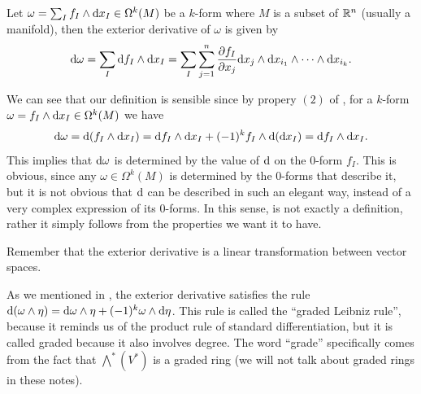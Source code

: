 \documentclass[11pt,a4paper]{article}
\begin{document}
\begin{definition}
  \label{def:exterior-derivative}
  Let $\omega = \sum_{I} f_{I} \wedge \dx_{I} \in \Omega^k(M)$
  be a $k$-form where $M$ is a subset of $\mathbb{R}^n$ (usually a manifold),
  then the exterior derivative of $\omega$
  is given by
  \[
    \dif \omega =
    \sum_{I} \dif f_I \wedge \dx_{I} =
    \sum_{I} \sum_{j=1}^{n}
      \frac{\partial f_I}{\partial x_j} \dx_j \wedge
        \dx_{i_1} \wedge \cdots \wedge \dx_{i_k}.
  \]
\end{definition}
\begin{remark}
  We can see that our definition is sensible since by propery $(2)$
  of ,
  for a $k$-form $\omega = f_I \wedge \dx_{I} \in \Omega^k(M)$ we have
  \[
    \dif \omega =
    \dif(f_I \wedge \dx_{I}) =
    \dif f_I \wedge \dx_I + (-1)^k f_I \wedge \dif (\dif x_I) =
    \dif f_I \wedge \dx_I.
  \]
  This implies that $\mathrm{d} \omega$ is determined by the value of $\mathrm{d}$
  on the $0$-form $f_I$.
  This is obvious, since any $\omega \in \Omega^k(M)$
  is determined by the $0$-forms that describe it,
  but it is not obvious that $\mathrm{d}$ can be described in such an
  elegant way, instead of a very complex expression of its $0$-forms.
  In this sense, 
  is not exactly a definition, rather it simply follows from the properties
  we want it to have.
\end{remark}

\begin{remark}
  Remember that the exterior derivative is a linear transformation between
  vector spaces.
\end{remark}
\begin{remark}
  As we mentioned in ,
  the exterior derivative satisfies the rule
  $\mathrm{d} (\omega \wedge \eta) =
        \mathrm{d} \omega \wedge \eta + (-1)^{k} \omega \wedge \mathrm{d} \eta$.
  This rule is called the ``graded Leibniz rule'',
  because it reminds us of the product rule of standard differentiation,
  but it is called graded because it also involves degree.
  The word ``grade'' specifically comes from
  the fact that $\bigwedge^{\!*}(V^*)$ is a graded ring
  (we will not talk about graded rings in these notes).
\end{remark}
\end{document}
